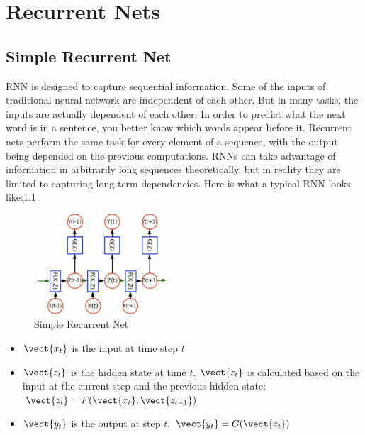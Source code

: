 \chapter{Recurrent Nets}

\section{Simple Recurrent Net}
\label{sec:SimpleRecNet}

RNN is designed to capture sequential information.
Some of the inputs of traditional neural network are independent of each other.
But in many tasks, the inputs are actually dependent of each other.
In order to predict what the next word is in a sentence, you better know which words appear before it.
Recurrent nets perform the same task for every element of a sequence, with the output being depended on the previous computations. 
RNNs can take advantage of information in arbitrarily long sequences theoretically, but in reality they are limited to capturing long-term dependencies.
Here is what a typical RNN looks like:\cref{fig:Simple RNN}

\begin{figure}[h]
    \centering
    \includegraphics[width=150pt]{lectures/06-b/image/rnn.png}
    \caption{Simple Recurrent Net}
    \label{fig:Simple RNN}
\end{figure}

\begin{itemize}
  \item $\vect{x_{t}}$ is the input at time step $t$
  \item $\vect{z_{t}}$ is the hidden state at time $t$. $\vect{z_{t}}$ is calculated based on the input at the current step and the previous hidden state:
  $\vect{z_t} = F(\vect{x_t}, \vect{z_{t-1}})$
  \item $\vect{y_t}$ is the output at step $t$. $\vect{y_t} = G(\vect{z_t})$
\end{itemize}



